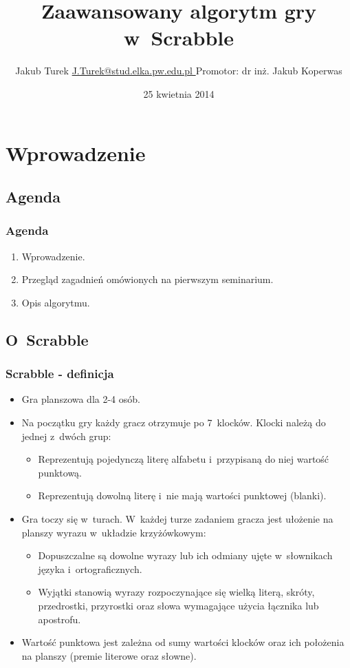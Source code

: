 \documentclass[10pt,a4paper]{beamer}
\author[Jakub Turek]{\texorpdfstring{Jakub Turek \newline \href{mailto:J.Turek@stud.elka.pw.edu.pl}{ J.Turek@stud.elka.pw.edu.pl }}{Jakub Turek} \newline \vskip2pt {\small Promotor: dr inż. Jakub Koperwas}}
\title{Zaawansowany algorytm gry w~Scrabble}
\institute{Wydział Elektroniki i~Technik Informacyjnych}
\date{25 kwietnia 2014}
\begin{document}
\begin{frame}
	\titlepage
\end{frame}

\section{Wprowadzenie}
\subsection{Agenda}

\begin{frame}
	\frametitle{Agenda}

	\begin{enumerate}
		\item Wprowadzenie.
		\item Przegląd zagadnień omówionych na pierwszym seminarium.
		\item Opis algorytmu.
	\end{enumerate}
\end{frame}

\subsection{O~Scrabble}

\begin{frame}
	\frametitle{Scrabble - definicja}

	\begin{itemize}
		\item Gra planszowa dla 2-4 osób.
		\item Na początku gry każdy gracz otrzymuje po 7~klocków. Klocki należą do jednej z~dwóch grup:
			\begin{itemize}
				\item Reprezentują pojedynczą literę alfabetu i~przypisaną do niej wartość punktową.
				\item Reprezentują dowolną literę i~nie mają wartości punktowej (blanki).
			\end{itemize}
		\item Gra toczy się w~turach. W~każdej turze zadaniem gracza jest ułożenie na planszy wyrazu w~układzie krzyżówkowym:
			\begin{itemize}
				\item Dopuszczalne są dowolne wyrazy lub ich odmiany ujęte w~słownikach języka i~ortograficznych.
				\item Wyjątki stanowią wyrazy rozpoczynające się wielką literą, skróty, przedrostki, przyrostki oraz słowa wymagające użycia łącznika lub apostrofu. 
			\end{itemize}
		\item Wartość punktowa jest zależna od sumy wartości klocków oraz ich położenia na planszy (premie literowe oraz słowne).
	\end{itemize}
\end{frame}
\end{document}
